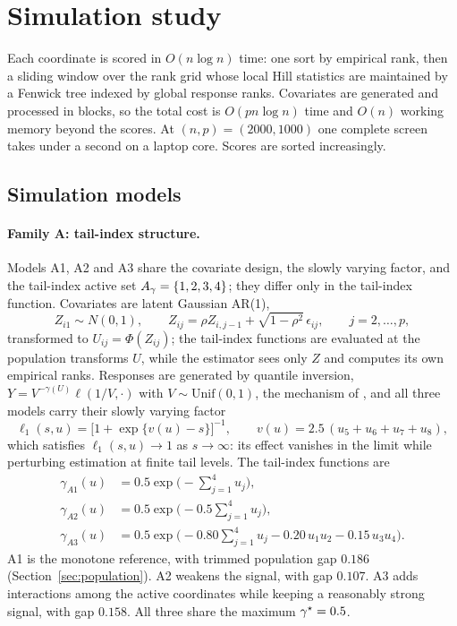 \section{Simulation study}\label{sec:simulation}

Each coordinate is scored in $O(n\log n)$ time: one sort by empirical
rank, then a sliding window over the rank grid whose local Hill statistics
are maintained by a Fenwick tree indexed by global response ranks.
Covariates are generated and processed in blocks, so the total cost is
$O(pn\log n)$ time and $O(n)$ working memory beyond the scores. At
$(n,p)=(2000,1000)$ one complete screen takes under a second on a laptop
core. Scores are sorted increasingly.

\subsection{Simulation models}\label{sec:models}

\paragraph{Family A: tail-index structure.}
Models A1, A2 and A3 share the covariate design, the slowly varying
factor, and the tail-index active set $A_\gamma=\{1,2,3,4\}$; they
differ only in the tail-index function. Covariates are latent Gaussian
AR(1),
\[
 Z_{i1}\sim N(0,1),\qquad
 Z_{ij}=\rho Z_{i,j-1}+\sqrt{1-\rho^2}\,\epsilon_{ij},
 \qquad j=2,\ldots,p,
\]
transformed to $U_{ij}=\Phi(Z_{ij})$; the tail-index functions are
evaluated at the population transforms $U$, while the estimator sees
only $Z$ and computes its own empirical ranks. Responses are generated
by quantile inversion, $Y=V^{-\gamma(U)}\ell(1/V,\cdot)$ with
$V\sim\mathrm{Unif}(0,1)$, the mechanism of
\citet{gardesPodgorny2025}, and all three models carry their slowly
varying factor
\[
 \ell_1(s,u)=\bigl[1+\exp\{v(u)-s\}\bigr]^{-1},
 \qquad
 v(u)=2.5\,(u_5+u_6+u_7+u_8),
\]
which satisfies $\ell_1(s,u)\to1$ as $s\to\infty$: its effect vanishes
in the limit while perturbing estimation at finite tail levels. The
tail-index functions are
\begin{align*}
 \gamma_{A1}(u)&=0.5\exp\bigl(-\textstyle\sum_{j=1}^4u_j\bigr),\\
 \gamma_{A2}(u)&=0.5\exp\bigl(-0.5\textstyle\sum_{j=1}^4u_j\bigr),\\
 \gamma_{A3}(u)&=0.5\exp\bigl(-0.80\textstyle\sum_{j=1}^4u_j
 -0.20\,u_1u_2-0.15\,u_3u_4\bigr).
\end{align*}
A1 is the monotone reference, with trimmed population gap $0.186$
(Section~\ref{sec:population}). A2 weakens the signal, with gap
$0.107$. A3 adds interactions among the active coordinates while
keeping a reasonably strong signal, with gap $0.158$. All three share
the maximum $\gamma^\star=0.5$.

